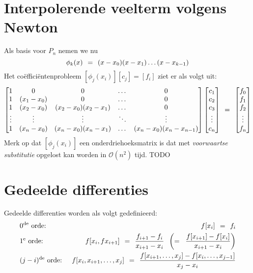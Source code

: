 \documentclass[11pt]{report}
\def \eq {\hspace{1.5mm}=\hspace{1.5mm}}
\def \h {\hspace{2mm}}
\begin{document}
\section{Interpolerende veelterm volgens Newton}
	Als basis voor $P_n$ nemen we nu
	\begin{equation}
		\phi_k(x) \eq (x-x_0)(x-x_1)\dots(x-x_{k-1})
	\end{equation}
	Het co\"{e}ffici\"{e}ntenprobleem $[\phi_j(x_i)][c_j] = [f_i]$ ziet er als volgt uit:
	\begin{equation}
		\begin{bmatrix}
			1 & 0 & 0 & \dots & 0 \\
			1 & (x_1 - x_0) & 0 & \dots & 0 \\
			1 & (x_2 - x_0) & (x_2-x_0)(x_2-x_1)&\dots &0\\
			\vdots & \vdots & \vdots & \ddots & \vdots\\
			1 & (x_n - x_0) & (x_n-x_0)(x_n-x_1)&\dots &(x_n-x_0)(x_n - x_{n-1})\\
		\end{bmatrix}
		\begin{bmatrix}
			c_1\\c_2\\c_3\\\vdots\\c_n
		\end{bmatrix} \eq 
		\begin{bmatrix}
			f_0\\f_1\\f_2\\\vdots\\f_n
		\end{bmatrix}
	\end{equation}
	Merk op dat $[\phi_j(x_i)]$ een onderdriehoeksmatrix is dat met \textit{voorwaartse substitutie} opgelost kan worden in $\mathcal O(n^2)$ tijd.
	TODO
	
\section{Gedeelde differenties}
	Gedeelde differenties worden als volgt gedefinieerd:
	\begin{align*}
		&0^{\text{de}}\text{ orde: } &f[x_i] \eq f_i\\
		&1^{\text{e}}\text{ orde: } &f[x_i, fx_{i+1}] \eq \frac{f_{i+1} - f_i}{x_{i+1} - x_i} \h\left(=\h \frac{f[x_{i+1}] - f[x_i]}{x_{i+1} - x_i} \right) \\
		&(j-i)^{\text{de}}\text{ orde: } &f[x_i, x_{i+1}, \dots, x_j] \eq \frac{f[x_{i+1}, \dots, x_j] - f[x_i, \dots, x_{j-1}]}{x_j - x_i}\\
	\end{align*}
	
\end{document}
